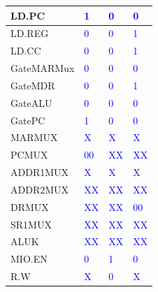 \documentclass{article}
\begin{document}
\begin{enumerate}[label=(\alph*)]
\begin{enumerate}[label=(\alph*), itemsep = 30pt]
\begin{table}[h]
\begin{tabular}{|>{\centering\arraybackslash}p{2.5cm}|>{\centering\arraybackslash}p{2.5cm}|>{\centering\arraybackslash}p{2.5cm}|>{\centering\arraybackslash}p{2.5cm}|}
            \hline
            LD.PC & \textcolor{blue}{1} & \textcolor{blue}{0} & \textcolor{blue}{0}\\
            \hline
            LD.REG & \textcolor{blue}{0} & \textcolor{blue}{0} & \textcolor{blue}{1}\\
            \hline
            LD.CC & \textcolor{blue}{0} & \textcolor{blue}{0} & \textcolor{blue}{1}\\
            \hline
            GateMARMux & \textcolor{blue}{0} & \textcolor{blue}{0} & \textcolor{blue}{0}\\
            \hline
            GateMDR & \textcolor{blue}{0} & \textcolor{blue}{0} & \textcolor{blue}{1}\\
            \hline
            GateALU & \textcolor{blue}{0} & \textcolor{blue}{0} & \textcolor{blue}{0}\\
            \hline
            GatePC & \textcolor{blue}{1} & \textcolor{blue}{0} & \textcolor{blue}{0}\\
            \hline
            MARMUX & \textcolor{blue}{X} & \textcolor{blue}{X} & \textcolor{blue}{X}\\
            \hline
            PCMUX & \textcolor{blue}{00} & \textcolor{blue}{XX} & \textcolor{blue}{XX}\\
            \hline
            ADDR1MUX & \textcolor{blue}{X} & \textcolor{blue}{X} & \textcolor{blue}{X}\\
            \hline
            ADDR2MUX & \textcolor{blue}{XX} & \textcolor{blue}{XX} & \textcolor{blue}{XX}\\
            \hline
            DRMUX & \textcolor{blue}{XX} & \textcolor{blue}{XX} & \textcolor{blue}{00}\\
            \hline
            SR1MUX & \textcolor{blue}{XX} & \textcolor{blue}{XX} & \textcolor{blue}{XX}\\
            \hline
            ALUK & \textcolor{blue}{XX} & \textcolor{blue}{XX} & \textcolor{blue}{XX}\\
            \hline
            MIO.EN & \textcolor{blue}{0} & \textcolor{blue}{1} & \textcolor{blue}{0}\\
            \hline
            R.W & \textcolor{blue}{X} & \textcolor{blue}{0} & \textcolor{blue}{X}\\
            \hline
            \end{tabular}
            \label{tab:modified}
            \newpage
        \end{table}
        \newpage
    \end{enumerate}


\end{enumerate}
\end{document}
